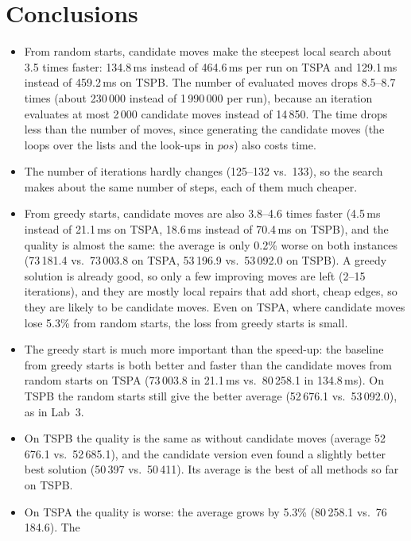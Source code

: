 \documentclass[11pt,a4paper]{article}
\begin{document}
\section{Conclusions}
\begin{itemize}
  \item From random starts, candidate moves make the steepest local search about 3.5 times faster:
        134.8\,ms instead of 464.6\,ms per run on TSPA and 129.1\,ms instead of 459.2\,ms on TSPB. The
        number of evaluated moves drops 8.5--8.7 times (about 230\,000 instead of 1\,990\,000 per run),
        because an iteration evaluates at most 2\,000 candidate moves instead of 14\,850. The time
        drops less than the number of moves, since generating the candidate moves (the loops over the
        lists and the look-ups in $\mathit{pos}$) also costs time.
  \item The number of iterations hardly changes (125--132 vs.\ 133), so the search makes about the
        same number of steps, each of them much cheaper.
  \item From greedy starts, candidate moves are also 3.8--4.6 times faster (4.5\,ms instead of
        21.1\,ms on TSPA, 18.6\,ms instead of 70.4\,ms on TSPB), and the quality is almost the same:
        the average is only 0.2\% worse on both instances (73\,181.4 vs.\ 73\,003.8 on TSPA,
        53\,196.9 vs.\ 53\,092.0 on TSPB). A greedy solution is already good, so only a few
        improving moves are left (2--15 iterations), and they are mostly local repairs that add
        short, cheap edges, so they are likely to be candidate moves. Even on TSPA, where candidate moves lose 5.3\% from random starts, the
        loss from greedy starts is small.
  \item The greedy start is much more important than the speed-up: the baseline from greedy starts
        is both better and faster than the candidate moves from random starts on TSPA (73\,003.8 in
        21.1\,ms vs.\ 80\,258.1 in 134.8\,ms). On TSPB the random starts still give the better average
        (52\,676.1 vs.\ 53\,092.0), as in Lab~3.
  \item On TSPB the quality is the same as without candidate moves (average 52\,676.1 vs.\
        52\,685.1), and the candidate version even found a slightly better best solution (50\,397 vs.\
        50\,411). Its average is the best of all methods so far on TSPB.
  \item On TSPA the quality is worse: the average grows by 5.3\% (80\,258.1 vs.\ 76\,184.6). The

\end{itemize}
\end{document}
